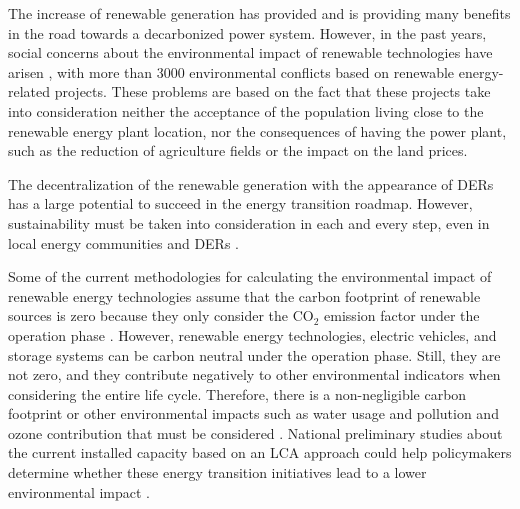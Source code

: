 The increase of renewable generation has provided and is providing many benefits in the road towards a decarbonized power system. However, in the past years, social concerns about the environmental impact of renewable technologies have arisen \cite{Temper2020}, with more than 3000 environmental conflicts based on renewable energy-related projects. These problems are based on the fact that these projects take into consideration neither the acceptance of the population living close to the renewable energy plant location, nor the consequences of having the power plant, such as the reduction of agriculture fields or the impact on the land prices. 


The decentralization of the renewable generation with the appearance of DERs has a large potential to succeed in the energy transition roadmap. However, sustainability must be taken into consideration in each and every step, even in local energy communities and DERs \cite{AMPONSAH2014461}.

Some of the current methodologies for calculating the environmental impact of renewable energy technologies assume that the carbon footprint of renewable sources is zero because they only consider the CO$_2$ emission factor under the operation phase \cite{IRENA2020}. However, renewable energy technologies, electric vehicles, and storage systems can be carbon neutral under the operation phase. Still, they are not zero, and they contribute negatively to other environmental indicators when considering the entire life cycle. Therefore, there is a non-negligible carbon footprint or other environmental impacts such as water usage and pollution and ozone contribution that must be considered \cite{en12214214, Moro2017, Jiang2018}. National preliminary studies about the current installed capacity based on an LCA approach could help policymakers determine whether these energy transition initiatives lead to a lower environmental impact \cite{Treyer2014}.


%

